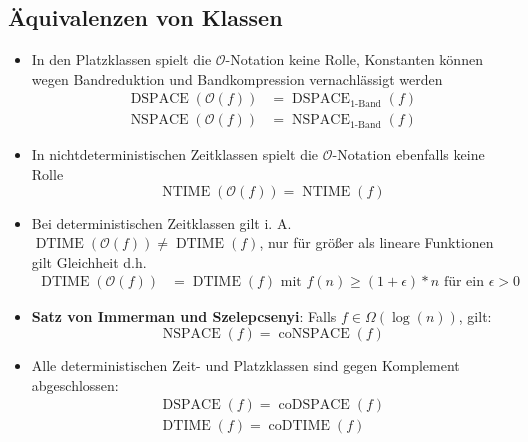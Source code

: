 \subsection{Äquivalenzen von Klassen}
\begin{itemize}
	\item In den Platzklassen spielt die $\mathcal O$-Notation keine Rolle, Konstanten können wegen Bandreduktion und Bandkompression vernachlässigt werden
	\begin{align*}
		\operatorname{DSPACE}(\mathcal O(f))&=\operatorname{DSPACE}_{\text{1-Band}}(f)\\
		\operatorname{NSPACE}(\mathcal O(f))&=\operatorname{NSPACE}_{\text{1-Band}}(f)
	\end{align*}
	\item In nichtdeterministischen Zeitklassen spielt die $\mathcal O$-Notation ebenfalls keine Rolle
	\begin{equation*}
		\operatorname{NTIME}(\mathcal O(f))=\operatorname{NTIME}(f)
	\end{equation*}
	\item Bei deterministischen Zeitklassen gilt i. A. $\operatorname{DTIME}(\mathcal O(f))\not=\operatorname{DTIME}(f)$, nur für größer als lineare Funktionen gilt Gleichheit d.h.
	\begin{align*}
		\operatorname{DTIME}(\mathcal O(f))&=\operatorname{DTIME}(f) \text{ mit } f(n)\geq (1+\epsilon)*n\text{ für ein }\epsilon>0
	\end{align*}
	\item \textbf{Satz von Immerman und Szelepcsenyi}: Falls $f\in \Omega(\log(n))$, gilt:
	\begin{equation*}
		\operatorname{NSPACE}(f)=\operatorname{coNSPACE}(f)
	\end{equation*}
	\item Alle deterministischen Zeit- und Platzklassen sind gegen Komplement abgeschlossen:
	\begin{gather*}
		\operatorname{DSPACE}(f)=\operatorname{coDSPACE}(f)\\
		\operatorname{DTIME}(f)=\operatorname{coDTIME}(f)
	\end{gather*}
\end{itemize}


